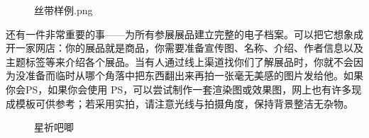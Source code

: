 \begin{figure}[H]
\centering
{}
\caption{丝带样例.png}
\end{figure}

还有一件非常重要的事------为所有参展展品建立完整的电子档案。可以把它想象成开一家网店：你的展品就是商品，你需要准备宣传图、名称、介绍、作者信息以及主题标签等来介绍各个展品。当有人通过线上渠道找你们了解展品时，你就不会因为没准备而临时从哪个角落中把东西翻出来再拍一张毫无美感的图片发给他。如果你会PS，如果你会使用
PS，可以尝试制作一套渲染图或效果图，网上也有许多现成模板可供参考；若采用实拍，请注意光线与拍摄角度，保持背景整洁无杂物。

\begin{figure}[H]
\centering
{}
\caption{星祈吧唧}
\end{figure}

